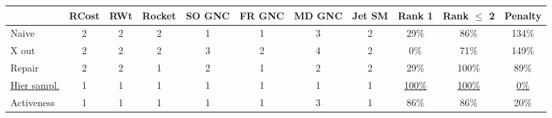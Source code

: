 \begin{tabular}{lcccccccccc}
\toprule
 & RCost & RWt & Rocket & SO GNC & FR GNC & MD GNC & Jet SM & Rank 1 & Rank $\leq$ 2 & Penalty \\
\midrule
Naive & {\cellcolor[HTML]{37A055}} \color[HTML]{F1F1F1} 2 & {\cellcolor[HTML]{37A055}} \color[HTML]{F1F1F1} 2 & {\cellcolor[HTML]{37A055}} \color[HTML]{F1F1F1} 2 & {\cellcolor[HTML]{00441B}} \color[HTML]{F1F1F1} 1 & {\cellcolor[HTML]{00441B}} \color[HTML]{F1F1F1} 1 & {\cellcolor[HTML]{AEDEA7}} \color[HTML]{000000} 3 & {\cellcolor[HTML]{37A055}} \color[HTML]{F1F1F1} 2 & {\cellcolor[HTML]{BAD6EB}} \color[HTML]{000000} 29\% & {\cellcolor[HTML]{0B559F}} \color[HTML]{F1F1F1} 86\% & {\cellcolor[HTML]{F7FCF5}} \color[HTML]{000000} 134\% \\
X out & {\cellcolor[HTML]{37A055}} \color[HTML]{F1F1F1} 2 & {\cellcolor[HTML]{37A055}} \color[HTML]{F1F1F1} 2 & {\cellcolor[HTML]{37A055}} \color[HTML]{F1F1F1} 2 & {\cellcolor[HTML]{AEDEA7}} \color[HTML]{000000} 3 & {\cellcolor[HTML]{37A055}} \color[HTML]{F1F1F1} 2 & {\cellcolor[HTML]{F7FCF5}} \color[HTML]{000000} 4 & {\cellcolor[HTML]{37A055}} \color[HTML]{F1F1F1} 2 & {\cellcolor[HTML]{F7FBFF}} \color[HTML]{000000} 0\% & {\cellcolor[HTML]{2B7BBA}} \color[HTML]{F1F1F1} 71\% & {\cellcolor[HTML]{F7FCF5}} \color[HTML]{000000} 149\% \\
Repair & {\cellcolor[HTML]{37A055}} \color[HTML]{F1F1F1} 2 & {\cellcolor[HTML]{37A055}} \color[HTML]{F1F1F1} 2 & {\cellcolor[HTML]{00441B}} \color[HTML]{F1F1F1} 1 & {\cellcolor[HTML]{37A055}} \color[HTML]{F1F1F1} 2 & {\cellcolor[HTML]{00441B}} \color[HTML]{F1F1F1} 1 & {\cellcolor[HTML]{37A055}} \color[HTML]{F1F1F1} 2 & {\cellcolor[HTML]{37A055}} \color[HTML]{F1F1F1} 2 & {\cellcolor[HTML]{BAD6EB}} \color[HTML]{000000} 29\% & {\cellcolor[HTML]{08306B}} \color[HTML]{F1F1F1} 100\% & {\cellcolor[HTML]{E8F6E3}} \color[HTML]{000000} 89\% \\
\underline{Hier sampl.} & {\cellcolor[HTML]{00441B}} \color[HTML]{F1F1F1} 1 & {\cellcolor[HTML]{00441B}} \color[HTML]{F1F1F1} 1 & {\cellcolor[HTML]{00441B}} \color[HTML]{F1F1F1} 1 & {\cellcolor[HTML]{00441B}} \color[HTML]{F1F1F1} 1 & {\cellcolor[HTML]{00441B}} \color[HTML]{F1F1F1} 1 & {\cellcolor[HTML]{00441B}} \color[HTML]{F1F1F1} 1 & {\cellcolor[HTML]{00441B}} \color[HTML]{F1F1F1} 1 & {\cellcolor[HTML]{08306B}} \color[HTML]{F1F1F1} \underline{100\%} & {\cellcolor[HTML]{08306B}} \color[HTML]{F1F1F1} \underline{100\%} & {\cellcolor[HTML]{00441B}} \color[HTML]{F1F1F1} \underline{0\%} \\
Activeness & {\cellcolor[HTML]{00441B}} \color[HTML]{F1F1F1} 1 & {\cellcolor[HTML]{00441B}} \color[HTML]{F1F1F1} 1 & {\cellcolor[HTML]{00441B}} \color[HTML]{F1F1F1} 1 & {\cellcolor[HTML]{00441B}} \color[HTML]{F1F1F1} 1 & {\cellcolor[HTML]{00441B}} \color[HTML]{F1F1F1} 1 & {\cellcolor[HTML]{AEDEA7}} \color[HTML]{000000} 3 & {\cellcolor[HTML]{00441B}} \color[HTML]{F1F1F1} 1 & {\cellcolor[HTML]{0B559F}} \color[HTML]{F1F1F1} 86\% & {\cellcolor[HTML]{0B559F}} \color[HTML]{F1F1F1} 86\% & {\cellcolor[HTML]{157F3B}} \color[HTML]{F1F1F1} 20\% \\
\bottomrule
\end{tabular}

